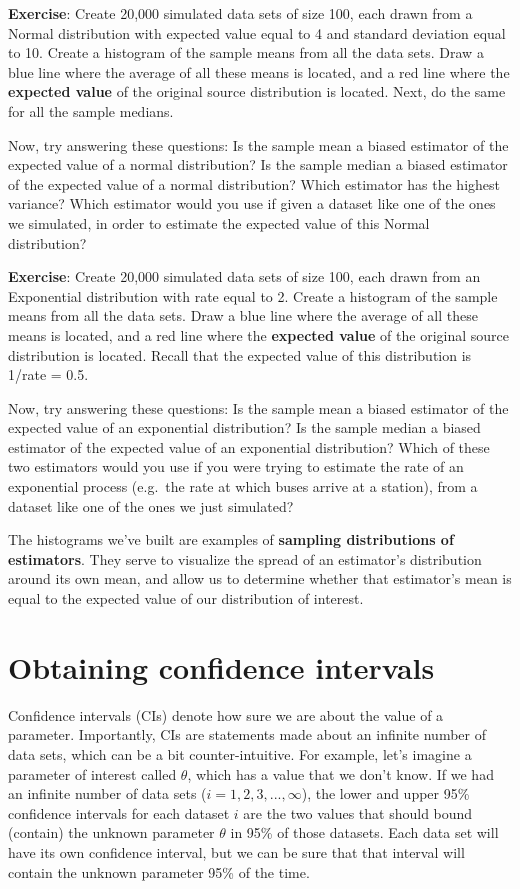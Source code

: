 \documentclass[
]{book}
\begin{document}
\textbf{Exercise}: Create 20,000 simulated data sets of size 100, each drawn from a Normal distribution with expected value equal to 4 and standard deviation equal to 10. Create a histogram of the sample means from all the data sets. Draw a blue line where the average of all these means is located, and a red line where the \textbf{expected value} of the original source distribution is located. Next, do the same for all the sample medians.

Now, try answering these questions: Is the sample mean a biased estimator of the expected value of a normal distribution? Is the sample median a biased estimator of the expected value of a normal distribution? Which estimator has the highest variance? Which estimator would you use if given a dataset like one of the ones we simulated, in order to estimate the expected value of this Normal distribution?

\textbf{Exercise}: Create 20,000 simulated data sets of size 100, each drawn from an Exponential distribution with rate equal to 2. Create a histogram of the sample means from all the data sets. Draw a blue line where the average of all these means is located, and a red line where the \textbf{expected value} of the original source distribution is located. Recall that the expected value of this distribution is 1/rate = 0.5.

Now, try answering these questions: Is the sample mean a biased estimator of the expected value of an exponential distribution? Is the sample median a biased estimator of the expected value of an exponential distribution? Which of these two estimators would you use if you were trying to estimate the rate of an exponential process (e.g.~the rate at which buses arrive at a station), from a dataset like one of the ones we just simulated?

The histograms we've built are examples of \textbf{sampling distributions of estimators}. They serve to visualize the spread of an estimator's distribution around its own mean, and allow us to determine whether that estimator's mean is equal to the expected value of our distribution of interest.

\hypertarget{obtaining-confidence-intervals}{%
\section{Obtaining confidence intervals}\label{obtaining-confidence-intervals}}

Confidence intervals (CIs) denote how sure we are about the value of a parameter. Importantly, CIs are statements made about an infinite number of data sets, which can be a bit counter-intuitive. For example, let's imagine a parameter of interest called \(\theta\), which has a value that we don't know. If we had an infinite number of data sets (\(i=1,2,3,...,\infty\)), the lower and upper 95\% confidence intervals for each dataset \(i\) are the two values that should bound (contain) the unknown parameter \(\theta\) in 95\% of those datasets. Each data set will have its own confidence interval, but we can be sure that that interval will contain the unknown parameter 95\% of the time.
\end{document}
